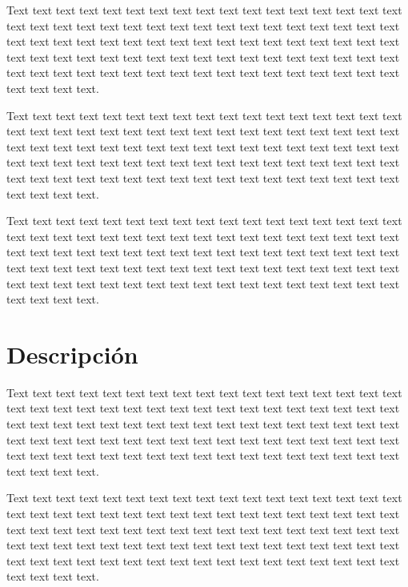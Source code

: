 \documentclass[12pt,a4paper]{article}
\begin{document}
Text text text text text text text text text text text text text text text text text text text text text text text text text text text text text text text text text text text text text text text text text text text text text text text text text text text text text text text text text text text text text text text text text text text text text text text text text text text text text text text text text text text text text text text text text.

Text text text text text text text text text text text text text text text text text text text text text text text text text text text text text text text text text text text text text text text text text text text text text text text text text text text text text text text text text text text text text text text text text text text text text text text text text text text text text text text text text text text text text text text text text.

Text text text text text text text text text text text text text text text text text text text text text text text text text text text text text text text text text text text text text text text text text text text text text text text text text text text text text text text text text text text text text text text text text text text text text text text text text text text text text text text text text text text text text text text text text.
\section{Descripción}\label{sec:Description}
Text text text text text text text text text text text text text text text text text text text text text text text text text text text text text text text text text text text text text text text text text text text text text text text text text text text text text text text text text text text text text text text text text text text text text text text text text text text text text text text text text text text text text text text text text.

Text text text text text text text text text text text text text text text text text text text text text text text text text text text text text text text text text text text text text text text text text text text text text text text text text text text text text text text text text text text text text text text text text text text text text text text text text text text text text text text text text text text text text text text text text.
\end{document}
